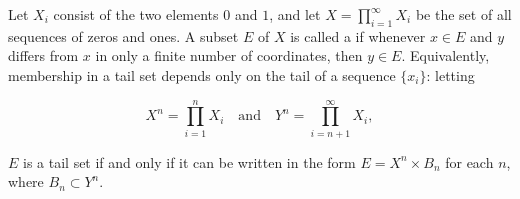 Let $X_i$ consist of the two elements $0$ and $1$, and let $X = \prod_{i=1}^{\infty} X_i$ be the set of all sequences of zeros and ones. A subset $E$ of $X$ is called a  if whenever $x \in E$ and $y$ differs from $x$ in only a finite number of coordinates, then $y \in E$. Equivalently, membership in a tail set depends only on the tail of a sequence $\{x_i\}$: letting

$$X^n = \prod_{i=1}^{n} X_i \quad \text{and} \quad Y^n = \prod_{i=n+1}^{\infty} X_i,$$

$E$ is a tail set if and only if it can be written in the form $E = X^n \times B_n$ for each $n$, where $B_n \subset Y^n$.
